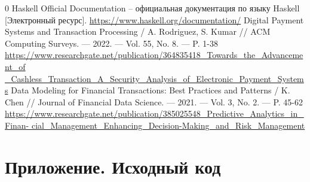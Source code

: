 \documentclass[a4paper, final]{article}
\begin{document}
	
	\newpage
	
	\vspace{-1.5cm}
	\begin{thebibliography}{0}
		Haskell Official Documentation -- официальная документация по языку Haskell [Электронный ресурс]. 	 
		\href {https://www.haskell.org/documentation/}{https://www.haskell.org/documentation/}
		Digital Payment Systems and Transaction Processing / A. Rodriguez, S. Kumar // ACM Computing Surveys. — 2022. — Vol. 55, No. 8. — P. 1-38
		\href {https://www.researchgate.net/publication/364835418_Towards_the_Advancement_of_Cashless_Transaction_A_Security_Analysis_of_Electronic_Payment_Systems}{https://www.researchgate.net/publication/364835418\_Towards\_the\_Advancement\_of
			\_Cashless\_Transaction\_A\_Security\_Analysis\_of\_Electronic\_Payment\_Systems}
		Data Modeling for Financial Transactions: Best Practices and Patterns / K. Chen // Journal of Financial Data Science. — 2021. — Vol. 3, No. 2. — P. 45-62	 
		\href {https://www.researchgate.net/publication/385025548_Predictive_Analytics_in_Financial_Management_Enhancing_Decision-Making_and_Risk_Management}{https://www.researchgate.net/publication/385025548\_Predictive\_Analytics\_in\_Finan-
			cial\_Management\_Enhancing\_Decision-Making\_and\_Risk\_Management}
		
	\end{thebibliography}
	
	\newpage
	\section*{Приложение. Исходный код}
	
\end{document}

